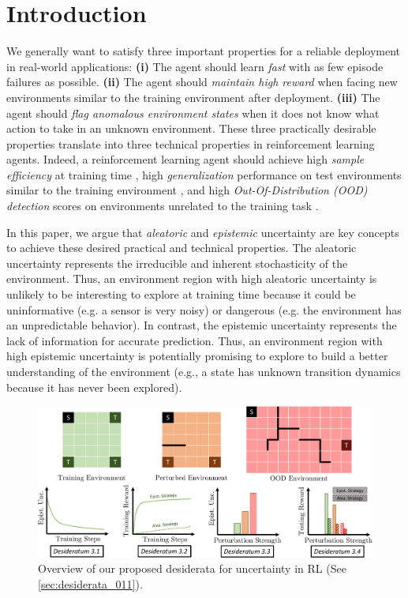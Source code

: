 \vspace{-3mm}
\section{Introduction}
\label{sec:introduction_011}

We generally want to satisfy three important properties for a reliable deployment in real-world applications: \textbf{(i)} The agent should learn \emph{fast} with as few episode failures as possible. \textbf{(ii)} The agent should \emph{maintain high reward} when facing new environments similar to the training environment after deployment. \textbf{(iii)} The agent should \emph{flag anomalous environment states} when it does not know what action to take in an unknown environment. These three practically desirable properties translate into three technical properties in reinforcement learning agents. Indeed, a reinforcement learning agent should achieve high \emph{sample efficiency} at training time \citep{sample-efficient-ac}, high \emph{generalization} performance on test environments similar to the training environment \citep{epistemic-pomdp}, and high \emph{Out-Of-Distribution (OOD) detection} scores on environments unrelated to the training task \citep{ood-detection-survey, ood-automotive-perception}. 

In this paper, we argue that \emph{aleatoric} and \emph{epistemic} uncertainty are key concepts to achieve these desired practical and technical properties. The aleatoric uncertainty represents the irreducible and inherent stochasticity of the environment. Thus, an environment region with high aleatoric uncertainty is unlikely to be interesting to explore at training time because it could be uninformative (e.g. a sensor is very noisy) or dangerous (e.g. the environment has an unpredictable behavior). In contrast, the epistemic uncertainty represents the lack of information for accurate prediction. Thus, an environment region with high epistemic uncertainty is potentially promising to explore to build a better understanding of the environment (e.g., a state has unknown transition dynamics because it has never been explored).

\begin{figure}[t]
    \centering
    \includegraphics[width=.99\linewidth]{sections/011_icml2022/resources/diagram-cropped_2.pdf}
    \caption{Overview of our proposed desiderata for uncertainty in RL (See \cref{sec:desiderata_011}).}
    \label{fig:diagram}
\end{figure}


